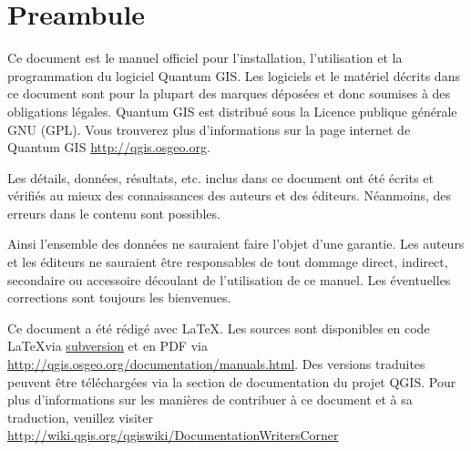 \newcommand\qgistip[1]{\raggedright\small{#1}}
\renewcommand{\topfraction}{0.85}
\renewcommand{\textfraction}{0.1}
\renewcommand{\floatpagefraction}{0.75}

\thispagestyle{empty}


\section*{Preambule}


\vspace{1cm}


Ce document est le manuel officiel pour l'installation, l'utilisation et la programmation du logiciel Quantum GIS. Les logiciels et le matériel décrits dans ce document sont pour la plupart des marques déposées et donc soumises à des obligations légales. Quantum GIS est distribué sous la Licence publique générale GNU (GPL). Vous trouverez plus d'informations sur la page internet de Quantum GIS \url{http://qgis.osgeo.org}.

Les détails, données, résultats, etc. inclus dans ce document ont été écrits et vérifiés au mieux des connaissances des auteurs et des éditeurs. Néanmoins, des erreurs dans le contenu sont possibles.

Ainsi l'ensemble des données ne sauraient faire l'objet d'une garantie. Les auteurs et les éditeurs ne sauraient être responsables de tout dommage direct, indirect, secondaire ou accessoire découlant de l'utilisation de ce manuel. Les éventuelles corrections sont toujours les bienvenues.

Ce document a été rédigé avec \LaTeX. Les sources sont disponibles en code \LaTeX via \href{http://wiki.qgis.org/qgiswiki/DocumentationWritersCorner}{subversion} et en PDF via \url{http://qgis.osgeo.org/documentation/manuals.html}. 
Des versions traduites peuvent être téléchargées via la section de documentation du projet QGIS. Pour plus d'informations sur les manières de contribuer à ce document et à sa traduction, veuillez visiter \url{http://wiki.qgis.org/qgiswiki/DocumentationWritersCorner} 

